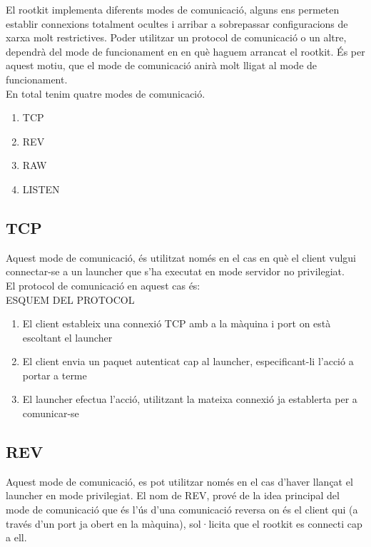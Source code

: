 El rootkit implementa diferents modes de comunicació, alguns ens permeten establir connexions totalment
ocultes i arribar a sobrepassar configuracions de xarxa molt restrictives. Poder utilitzar un protocol de 
comunicació o un altre, dependrà del mode de funcionament en en què haguem arrancat el rootkit. És per aquest
motiu, que el mode de comunicació anirà molt lligat al mode de funcionament. \\

En total tenim quatre modes de comunicació. \\

\begin{enumerate}
    \item TCP
    \item REV
    \item RAW
    \item LISTEN
\end{enumerate}

\subsection{TCP}

Aquest mode de comunicació, és utilitzat només en el cas en què el client vulgui connectar-se a un launcher que
s'ha executat en mode servidor no privilegiat. \\

El protocol de comunicació en aquest cas és: \\

ESQUEM DEL PROTOCOL \\

\begin{enumerate}
    \item El client estableix una connexió TCP amb a la màquina i port on està escoltant el launcher
    \item El client envia un paquet autenticat cap al launcher, especificant-li l'acció a portar a terme
    \item El launcher efectua l'acció, utilitzant la mateixa connexió ja establerta per a comunicar-se
\end{enumerate}

\subsection{REV}

Aquest mode de comunicació, es pot utilitzar només en el cas d'haver llançat el launcher en mode privilegiat.
El nom de REV, prové de la idea principal del mode de comunicació que és l'ús d'una comunicació reversa on 
és el client qui (a través d'un port ja obert en la màquina), sol·licita que el rootkit es connecti cap a ell. \\

